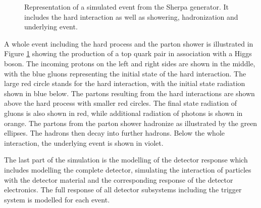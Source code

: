 \begin{figure}[htbp!]
  \begin{center}
\caption{Representation of a simulated event from the Sherpa generator. It includes the hard interaction as well as showering, hadronization and underlying event\cite{Gleisberg:2008ta}.
  \label{fig:sim_sherpa}}
  \end{center}
\end{figure}

A whole event including the hard process and the parton shower is illustrated in Figure \ref{fig:sim_sherpa} showing the production of a top quark pair in association with a Higgs boson.
The incoming protons on the left and right sides are shown in the middle, with the blue gluons representing the initial state of the hard interaction.
The large red circle stands for the hard interaction, with the initial state radiation shown in blue below.
The partons resulting from the hard interactions are shown above the hard process with smaller red circles. The final state radiation of gluons is also shown in red, while additional radiation of photons is shown in orange.
The partons from the parton shower hadronize as illustrated by the green ellipses. The hadrons then decay into further hadrons.
Below the whole interaction, the underlying event is shown in violet.

The last part of the simulation is the modelling of the detector response which includes modelling the complete detector, simulating the interaction of particles with the detector material and the corresponding
response of the detector electronics. The full response of all detector subsystems including the trigger system is modelled for each event.

